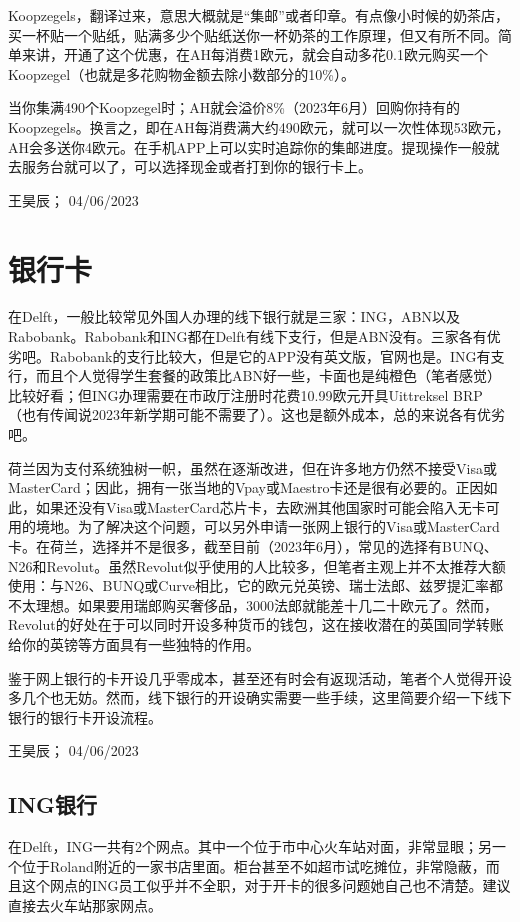 Koopzegels，翻译过来，意思大概就是“集邮”或者印章。有点像小时候的奶茶店，买一杯贴一个贴纸，贴满多少个贴纸送你一杯奶茶的工作原理，但又有所不同。简单来讲，开通了这个优惠，在AH每消费1欧元，就会自动多花0.1欧元购买一个Koopzegel（也就是多花购物金额去除小数部分的10\%）。

当你集满490个Koopzegel时；AH就会溢价8\%（2023年6月）回购你持有的Koopzegels。换言之，即在AH每消费满大约490欧元，就可以一次性体现53欧元，AH会多送你4欧元。在手机APP上可以实时追踪你的集邮进度。提现操作一般就去服务台就可以了，可以选择现金或者打到你的银行卡上。
\begin{flushright}
王昊辰； 04/06/2023
\end{flushright}
\vspace{\betsubsec} %

\section{银行卡}
在Delft，一般比较常见外国人办理的线下银行就是三家：ING，ABN以及Rabobank。Rabobank和ING都在Delft有线下支行，但是ABN没有。三家各有优劣吧。Rabobank的支行比较大，但是它的APP没有英文版，官网也是。ING有支行，而且个人觉得学生套餐的政策比ABN好一些，卡面也是纯橙色（笔者感觉）比较好看；但ING办理需要在市政厅注册时花费10.99欧元开具Uittreksel BRP （也有传闻说2023年新学期可能不需要了）。这也是额外成本，总的来说各有优劣吧。

荷兰因为支付系统独树一帜，虽然在逐渐改进，但在许多地方仍然不接受Visa或MasterCard；因此，拥有一张当地的Vpay或Maestro卡还是很有必要的。正因如此，如果还没有Visa或MasterCard芯片卡，去欧洲其他国家时可能会陷入无卡可用的境地。为了解决这个问题，可以另外申请一张网上银行的Visa或MasterCard卡。在荷兰，选择并不是很多，截至目前（2023年6月），常见的选择有BUNQ、N26和Revolut。虽然Revolut似乎使用的人比较多，但笔者主观上并不太推荐大额使用：与N26、BUNQ或Curve相比，它的欧元兑英镑、瑞士法郎、兹罗提汇率都不太理想。如果要用瑞郎购买奢侈品，3000法郎就能差十几二十欧元了。然而，Revolut的好处在于可以同时开设多种货币的钱包，这在接收潜在的英国同学转账给你的英镑等方面具有一些独特的作用。

鉴于网上银行的卡开设几乎零成本，甚至还有时会有返现活动，笔者个人觉得开设多几个也无妨。然而，线下银行的开设确实需要一些手续，这里简要介绍一下线下银行的银行卡开设流程。
\begin{flushright}
王昊辰； 04/06/2023
\end{flushright}

\subsection{ING银行}
在Delft，ING一共有2个网点。其中一个位于市中心火车站对面，非常显眼；另一个位于Roland附近的一家书店里面。柜台甚至不如超市试吃摊位，非常隐蔽，而且这个网点的ING员工似乎并不全职，对于开卡的很多问题她自己也不清楚。建议直接去火车站那家网点。


